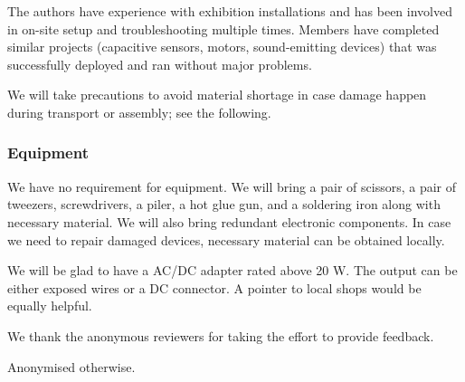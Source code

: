 \documentclass{nimemusic}
\begin{document}
The authors have experience with exhibition installations and has been involved in on-site setup and troubleshooting multiple times. Members have completed similar projects (capacitive sensors, motors, sound-emitting devices) that was successfully deployed and ran without major problems.

We will take precautions to avoid material shortage in case damage happen during transport or assembly; see the following.

\subsubsection{Equipment}
We have no requirement for equipment. We will bring a pair of scissors, a pair of tweezers, screwdrivers, a piler, a hot glue gun, and a soldering iron along with necessary material. We will also bring redundant electronic components. In case we need to repair damaged devices, necessary material can be obtained locally.

We will be glad to have a AC/DC adapter rated above 20 W. The output can be either exposed wires or a DC connector. A pointer to local shops would be equally helpful.

\begin{acks}
We thank the anonymous reviewers for taking the effort to provide feedback.

Anonymised otherwise.
\end{acks}

% 
% 
\end{document}

